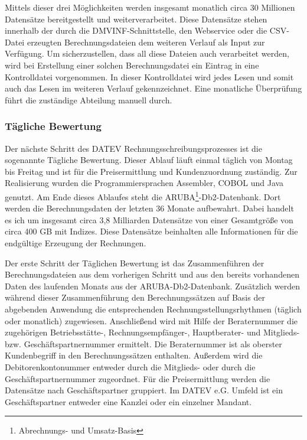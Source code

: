 Mittels dieser drei Möglichkeiten werden insgesamt monatlich circa 30 Millionen Datensätze bereitgestellt und weiterverarbeitet.
Diese Datensätze stehen innerhalb der durch die DMVINF-Schnittstelle, den Webservice oder die CSV-Datei erzeugten Berechnungsdateien dem weiteren Verlauf als Input zur Verfügung.
Um sicherzustellen, dass all diese Dateien auch verarbeitet werden, wird bei Erstellung einer solchen Berechnungsdatei ein Eintrag in eine Kontrolldatei vorgenommen.
In dieser Kontrolldatei wird jedes Lesen und somit auch das Lesen im weiteren Verlauf gekennzeichnet.
Eine monatliche Überprüfung führt die zuständige Abteilung manuell durch. 

\subsubsection{Tägliche Bewertung}\label{sssec:täglbew}
Der nächste Schritt des DATEV Rechnungsschreibungsprozesses ist die sogenannte \glqq Tägliche Bewertung\grqq.
Dieser Ablauf läuft einmal täglich von Montag bis Freitag und ist für die Preisermittlung und Kundenzuordnung zuständig.
Zur Realisierung wurden die Programmiersprachen Assembler, COBOL und Java genutzt.
Am Ende dieses Ablaufes steht die ARUBA\footnote{Abrechnungs- und Umsatz-Basis}-Db2-Datenbank.
Dort werden die Berechnungsdaten der letzten 36 Monate aufbewahrt.
Dabei handelt es ich um insgesamt circa 3,8 Milliarden Datensätze von einer Gesamtgröße von circa 400 GB mit Indizes.
Diese Datensätze beinhalten alle Informationen für die endgültige Erzeugung der Rechnungen.

Der erste Schritt der Täglichen Bewertung ist das Zusammenführen der Berechnungsdateien aus dem vorherigen Schritt und aus den bereits vorhandenen Daten des laufenden Monats aus der ARUBA-Db2-Datenbank.
Zusätzlich werden während dieser Zusammenführung den Berechnungssätzen auf Basis der abgebenden Anwendung die entsprechenden Rechnungsstellungsrhythmen (täglich oder monatlich) zugewiesen.
Anschließend wird mit Hilfe der Beraternummer die zugehörigen Betriebsstätte-, Rechnungsempfänger-, Hauptberater- und Mitglieds- bzw. Geschäftspartnernummer ermittelt.
Die Beraternummer ist als oberster Kundenbegriff in den Berechnungssätzen enthalten.
Außerdem wird die Debitorenkontonummer entweder durch die Mitglieds- oder durch die Geschäftspartnernummer zugeordnet.
Für die Preisermittlung werden die Datensätze nach Geschäftspartner gruppiert.
Im DATEV e.G. Umfeld ist ein Geschäftspartner entweder eine Kanzlei oder ein einzelner Mandant.

